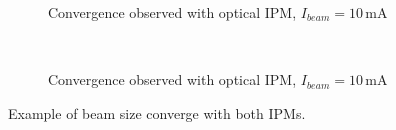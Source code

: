 \begin{figure}[!ht]
  \begin{subfigure}[t]{0.5\textwidth}
    
    \caption{Convergence observed with optical IPM, $I_{beam} = 10\,\mathrm{mA}$}
    \label{}
  \end{subfigure}
  ~
  \begin{subfigure}[t]{0.5\textwidth}
    
    \caption{Convergence observed with optical IPM, $I_{beam} = 10\,\mathrm{mA}$}
    \label{}
  \end{subfigure}
  \caption[]{Example of beam size converge with both IPMs.}
  \label{chap:}
\end{figure}
